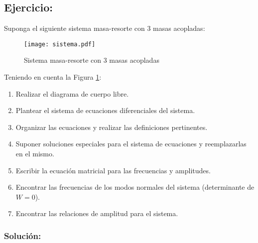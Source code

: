 





\begin{multicols}{2}

\section*{Ejercicio:}

Suponga el siguiente sistema masa-resorte con 3 masas acopladas:

\begin{figure}[H]
\begin{center}
\texttt{[image: sistema.pdf]}
\caption{Sistema masa-resorte con 3 masas acopladas}
\label{fig:1}
\end{center}
\end{figure}

Teniendo en cuenta la Figura \ref{fig:1}:

\begin{enumerate}[leftmargin=15pt]
    \item Realizar el diagrama de cuerpo libre.
    \item Plantear el sistema de ecuaciones diferenciales del sistema.
    \item Organizar las ecuaciones y realizar las definiciones pertinentes.
    \item Suponer soluciones especiales para el sistema de ecuaciones y reemplazarlas en el mismo.
    \item Escribir la ecuación matricial para las frecuencias y amplitudes.
    \item Encontrar las frecuencias de los modos normales del sistema (determinante de $W = 0$).
    \item Encontrar las relaciones de amplitud para el sistema.
\end{enumerate}

\subsubsection*{Solución:}


\end{multicols}
